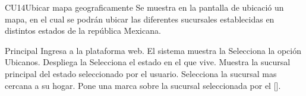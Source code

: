 
% 




\begin{UseCase}{CU14}{Ubicar mapa geograficamente}{
		Se muestra en la pantalla de ubicació un mapa, en el cual se podrán ubicar las diferentes sucursales establecidas en distintos estados de la república Mexicana.
	}
	\end{UseCase}

	\begin{UCtrayectoria}{Principal}
		\UCpaso[\UCactor] Ingresa a la plataforma web.
		\UCpaso El sistema muestra la 
		\UCpaso[\UCactor] Selecciona la opción Ubicanos.
		\UCpaso Despliega la 
		\UCpaso[\UCactor] Selecciona el estado en el que vive.
		\UCpaso Muestra la sucursal principal del estado seleccionado por el usuario.
		\UCpaso[\UCactor] Selecciona la sucursal mas cercana a su hogar.
		\UCpaso Pone una marca sobre la sucursal seleccionada por el [\UCactor].
	\end{UCtrayectoria}

